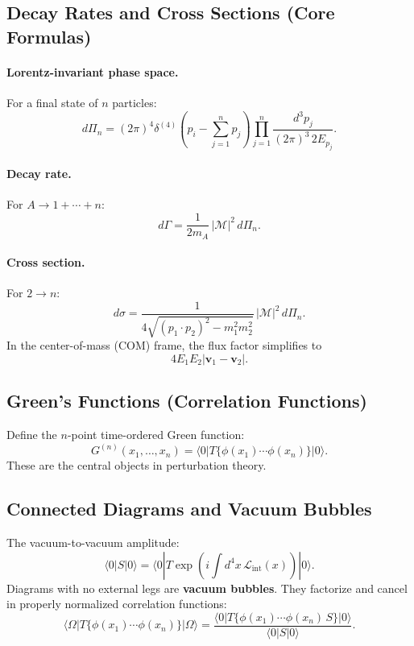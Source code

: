 \subsection{Decay Rates and Cross Sections (Core Formulas)}
\paragraph{Lorentz-invariant phase space.}
For a final state of $n$ particles:
\begin{equation}
d\Pi_n = (2\pi)^4\delta^{(4)}\!\left(p_i-\sum_{j=1}^n p_j\right)
\prod_{j=1}^n \frac{d^3p_j}{(2\pi)^3\,2E_{p_j}}.
\end{equation}

\paragraph{Decay rate.}
For $A\to 1+\cdots+n$:
\begin{equation}
d\Gamma = \frac{1}{2m_A}\,|\mathcal{M}|^2\, d\Pi_n.
\end{equation}

\paragraph{Cross section.}
For $2\to n$:
\begin{equation}
d\sigma = \frac{1}{4\sqrt{(p_1\cdot p_2)^2-m_1^2m_2^2}}\,|\mathcal{M}|^2\, d\Pi_n.
\end{equation}
In the center-of-mass (COM) frame, the flux factor simplifies to
\begin{equation}
4E_1E_2|\mathbf{v}_1-\mathbf{v}_2|.
\end{equation}

\subsection{Green's Functions (Correlation Functions)}
Define the $n$-point time-ordered Green function:
\begin{equation}
G^{(n)}(x_1,\dots,x_n)
=
\langle 0|T\{\phi(x_1)\cdots\phi(x_n)\}|0\rangle.
\end{equation}
These are the central objects in perturbation theory.

\subsection{Connected Diagrams and Vacuum Bubbles}
The vacuum-to-vacuum amplitude:
\begin{equation}
\langle 0|S|0\rangle
=
\langle 0|T\exp\left(i\int d^4x\,\mathcal{L}_{\mathrm{int}}(x)\right)|0\rangle.
\end{equation}
Diagrams with no external legs are \textbf{vacuum bubbles}. They factorize and cancel in
properly normalized correlation functions:
\begin{equation}
\langle \Omega|T\{\phi(x_1)\cdots\phi(x_n)\}|\Omega\rangle
=
\frac{\langle 0|T\{\phi(x_1)\cdots\phi(x_n)\,S\}|0\rangle}{\langle 0|S|0\rangle}.
\end{equation}

